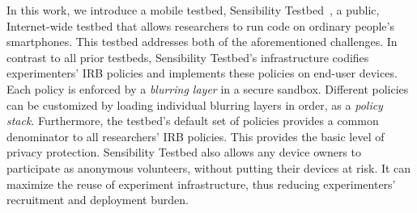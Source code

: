 In this work, we introduce a mobile testbed, 
Sensibility Testbed~\cite{sensibility, zhuang2015privacy}, a public, 
Internet-wide testbed that allows researchers to run code on ordinary
people's smartphones. This testbed addresses both of the 
aforementioned challenges.
%   
In contrast to all prior testbeds, Sensibility Testbed's
infrastructure codifies experimenters' IRB policies and 
implements these policies on end-user devices. Each 
policy is enforced by a \textit{blurring layer} in a secure 
sandbox. Different policies can be customized by loading
individual blurring layers in order, as a \textit{policy stack}. 
Furthermore, the testbed's default set of policies provides a 
common denominator to all researchers' IRB policies. This 
provides the basic level of privacy protection. 
Sensibility Testbed also allows
any device owners to participate as anonymous volunteers,
without putting their devices at risk. It can 
maximize the reuse of experiment infrastructure, thus reducing 
experimenters' recruitment and deployment burden. 
%
%
%
%
			
